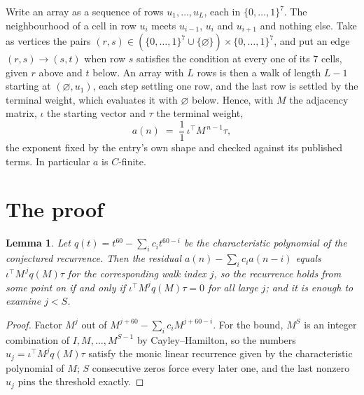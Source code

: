 \documentclass[11pt,a4paper]{article}
\theoremstyle{plain}
\newtheorem{lemma}[theorem]{Lemma}
\theoremstyle{definition}
\begin{document}
Write an array as a sequence of rows $u_1,\dots,u_L$, each in
$\{0,\dots,1\}^{7}$. The neighbourhood of a cell in row $u_i$ meets $u_{i-1}$,
$u_i$ and $u_{i+1}$ and nothing else. Take as vertices the pairs
$(r,s)\in(\{0,\dots,1\}^{7}\cup\{\varnothing\})\times\{0,\dots,1\}^{7}$,
and put an edge $(r,s)\to(s,t)$ when row $s$ satisfies the condition at every one of its
$7$ cells, given $r$ above and $t$ below. An array with $L$ rows is then a walk of length
$L-1$ starting at $(\varnothing,u_1)$, each step settling one row, and the last row is
settled by the terminal weight, which evaluates it with $\varnothing$ below. Hence,
with $M$ the adjacency matrix, $\iota$ the starting vector and $\tau$ the terminal weight,
\[
a(n)\;=\;\frac{1}{1}\,\iota^{\!\top}M^{\,n-1}\tau ,
\]
the exponent fixed by the entry's own shape and checked against its published terms. In
particular $a$ is $C$-finite.

\section{The proof}

\begin{lemma}\label{lem:crit}
Let $q(t)=t^{60}-\sum_i c_it^{60-i}$ be the characteristic polynomial of the
conjectured recurrence. Then the residual $a(n)-\sum_ic_ia(n-i)$ equals
$\iota^{\!\top}M^{\,j}q(M)\tau$ for the corresponding walk index $j$, so the
recurrence holds from some point on if and only if $\iota^{\!\top}M^{j}q(M)\tau=0$ for all
large $j$; and it is enough to examine $j<S$.
\end{lemma}

\begin{proof}
Factor $M^{j}$ out of $M^{j+60}-\sum_ic_iM^{j+60-i}$. For the bound, $M^{S}$
is an integer combination of $I,M,\dots,M^{S-1}$ by Cayley--Hamilton, so the numbers
$u_j=\iota^{\!\top}M^{j}q(M)\tau$ satisfy the monic linear recurrence given by the
characteristic polynomial of $M$; $S$ consecutive zeros force every later one, and the last
nonzero $u_j$ pins the threshold exactly.
\end{proof}
\end{document}
